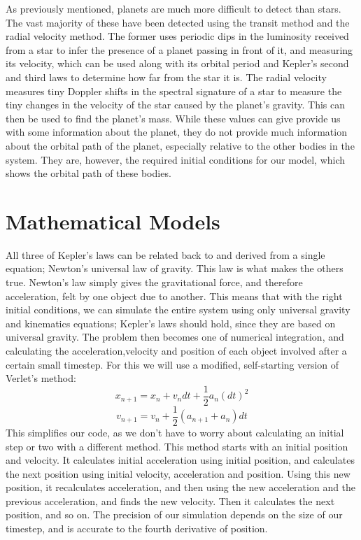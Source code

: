 \documentclass[12pt]{article}
\begin{document}
As previously mentioned, planets are much more difficult to detect than stars. The vast majority of these have been detected using the transit method and the radial velocity method. The former uses periodic dips in the luminosity received from a star to infer the presence of a planet passing in front of it, and measuring its velocity, which can be used along with its orbital period and Kepler's second and third laws to determine how far from the star it is. The radial velocity measures tiny Doppler shifts in the spectral signature of a star to measure the tiny changes in the velocity of the star caused by the planet's gravity. This can then be used to find the planet's mass. While these values can give provide us with some information about the planet, they do not provide much information about the orbital path of the planet, especially relative to the other bodies in the system. They are, however, the required initial conditions for our model, which shows the orbital path of these bodies.

\section{Mathematical Models}
All three of Kepler’s laws can be related back to and derived from a single equation; Newton’s universal law of gravity. This law is what makes the others true. Newton’s law simply gives the gravitational force, and therefore acceleration, felt by one object due to another. This means that with the right initial conditions, we can simulate the entire system using only universal gravity and kinematics equations; Kepler’s laws should hold, since they are based on universal gravity. The problem then becomes one of numerical integration, and calculating the acceleration,velocity and position of each object involved after a certain small timestep. For this we will use a modified, self-starting version of Verlet’s method: \[x_{n+1} = x_{n} + v_{n}dt + \frac{1}{2}a_{n}(dt)^{2}\]
\[v_{n+1} = v_{n} + \frac{1}{2}(a_{n+1} + a_{n})dt\]
This simplifies our code, as we don’t have to worry about calculating an initial step or two with a different method. This method starts with an initial position and velocity. It calculates initial acceleration using initial position, and calculates the next position using initial velocity, acceleration and position. Using this new position, it recalculates acceleration, and then using the new acceleration and the previous acceleration, and finds the new velocity. Then it calculates the next position, and so on. The precision of our simulation depends on the size of our timestep, and is accurate to the fourth derivative of position.
\end{document}
